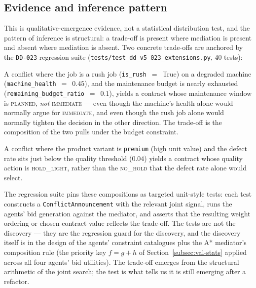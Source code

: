 \subsection*{Evidence and inference pattern}

This is qualitative-emergence evidence, not a statistical
distribution test, and the pattern of inference is structural: a
trade-off is present where mediation is present and absent where
mediation is absent. Two concrete trade-offs are anchored by the
\texttt{DD-023} regression suite
(\texttt{tests/test\_dd\_v5\_023\_extensions.py}, $40$ tests):

\begin{description}[leftmargin=2.4em,style=nextline,itemsep=0.25em]
  \item[F6 --- rush job under a tight maintenance budget defers
    maintenance.] A conflict where the job is a rush job
    (\texttt{is\_rush}~$=$~True) on a degraded machine
    (\texttt{machine\_health}~$=$~$0.45$), and the maintenance budget is
    nearly exhausted (\texttt{remaining\_budget\_ratio}~$=$~$0.1$),
    yields a contract whose maintenance window is \textsc{planned},
    \emph{not} \textsc{immediate} --- even though the machine's
    health alone would normally argue for \textsc{immediate}, and
    even though the rush job alone would normally tighten the
    decision in the other direction. The trade-off is the
    composition of the two pulls under the budget constraint.
  \item[F7 --- premium product on a borderline defect rate
    triggers a partial quality hold.] A conflict where the product
    variant is \texttt{premium} (high unit value) and the defect
    rate sits just below the quality threshold ($0.04$) yields a
    contract whose quality action is \textsc{hold\_light}, rather
    than the \textsc{no\_hold} that the defect rate alone would
    select.
\end{description}

The regression suite pins these compositions as targeted unit-style
tests: each test constructs a \texttt{ConflictAnnouncement} with the
relevant joint signal, runs the agents' bid generation against the
mediator, and asserts that the resulting weight ordering or chosen
contract value reflects the trade-off. The tests are not the
discovery --- they are the regression guard for the discovery, and
the discovery itself is in the design of the agents' constraint
catalogues plus the A* mediator's composition rule (the priority key
$f = g + h$ of Section~\ref{subsec:val-stats} applied across all four
agents' bid utilities). The trade-off emerges from the structural
arithmetic of the joint search; the test is what tells us it is still
emerging after a refactor.


